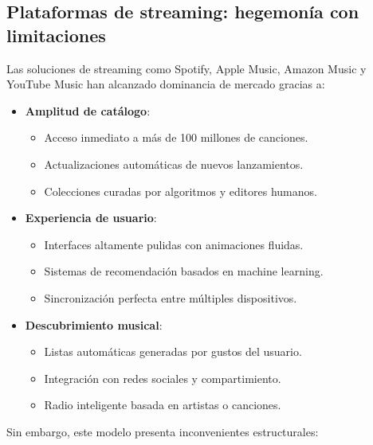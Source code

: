\documentclass[11pt, a4paper]{article}
\begin{document}
  \subsection{Plataformas de streaming: hegemonía con limitaciones}

  Las soluciones de streaming como Spotify, Apple Music, Amazon Music y YouTube Music han alcanzado dominancia de mercado gracias a:

  \begin{itemize}
      \item \textbf{Amplitud de catálogo}:
      \begin{itemize}
          \item Acceso inmediato a más de 100 millones de canciones.
          \item Actualizaciones automáticas de nuevos lanzamientos.
          \item Colecciones curadas por algoritmos y editores humanos.
      \end{itemize}
      
      \item \textbf{Experiencia de usuario}:
      \begin{itemize}
          \item Interfaces altamente pulidas con animaciones fluidas.
          \item Sistemas de recomendación basados en machine learning.
          \item Sincronización perfecta entre múltiples dispositivos.
      \end{itemize}
      
      \item \textbf{Descubrimiento musical}:
      \begin{itemize}
          \item Listas automáticas generadas por gustos del usuario.
          \item Integración con redes sociales y compartimiento.
          \item Radio inteligente basada en artistas o canciones.
      \end{itemize}
  \end{itemize}

  Sin embargo, este modelo presenta inconvenientes estructurales:
\end{document}
